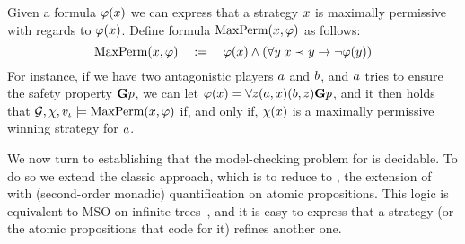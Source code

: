 \begin{example}
  Given a formula $\phi(\var)$ we can express that a strategy $\var$
  is maximally permissive with regards to  $\phi(\var)$. Define formula $\maxperm(\var,\phi)$ as
  follows:
  \[\maxperm(\var,\phi) \quad := \quad \phi(\var) \wedge (\forall \varb \;
    \var \refinesstr \varb \impl \neg \phi(\varb))\]
  For instance, if we have two antagonistic players $\ag$ and $\agb$,
  and $\ag$ tries to ensure the safety property $\always p$, we can let $\phi(\var)=\forall \varc
  \bind[\ag]{\var}\bind[\agb]{\varc}\always p$, and it then holds that
  $\CGS,\assign,\pos_\init\models \maxperm(\var,\phi)$ if, and only
  if, $\assign(\var)$ is a maximally permissive winning strategy for $\ag$.
\end{example}


We now turn to establishing that the model-checking problem for \SLref
is decidable. To do so we extend the classic approach, which is to
reduce to \QCTLs, the extension of \CTLs with (second-order monadic) quantification on atomic
propositions. This logic is equivalent to MSO on infinite
trees~\cite{DBLP:journals/corr/LaroussinieM14}, and it is  easy to
express that a strategy (or the atomic propositions that code for it)
refines another one.

